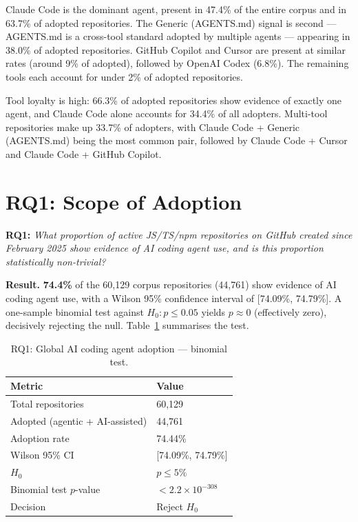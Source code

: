 Claude Code is the dominant agent, present in 47.4\% of the entire corpus and in 63.7\% of adopted repositories. The Generic (AGENTS.md) signal is second --- AGENTS.md is a cross-tool standard adopted by multiple agents --- appearing in 38.0\% of adopted repositories. GitHub Copilot and Cursor are present at similar rates (around 9\% of adopted), followed by OpenAI Codex (6.8\%). The remaining tools each account for under 2\% of adopted repositories.

Tool loyalty is high: 66.3\% of adopted repositories show evidence of exactly one agent, and Claude Code alone accounts for 34.4\% of all adopters. Multi-tool repositories make up 33.7\% of adopters, with Claude Code + Generic (AGENTS.md) being the most common pair, followed by Claude Code + Cursor and Claude Code + GitHub Copilot.

\section{RQ1: Scope of Adoption}
\label{sec:res:rq1}

\textbf{RQ1:} \textit{What proportion of active JS/TS/npm repositories on GitHub created since February 2025 show evidence of AI coding agent use, and is this proportion statistically non-trivial?}

\textbf{Result.} \textbf{74.4\%} of the 60,129 corpus repositories (44,761) show evidence of AI coding agent use, with a Wilson 95\% confidence interval of [74.09\%, 74.79\%]. A one-sample binomial test against $H_0: p \leq 0.05$ yields $p \approx 0$ (effectively zero), decisively rejecting the null. Table~\ref{tab:rq1} summarises the test.

\begin{table}[h]
\centering
\caption{RQ1: Global AI coding agent adoption --- binomial test.}
\label{tab:rq1}
\begin{tabular}{@{}ll@{}}
\toprule
Metric & Value \\
\midrule
Total repositories              & 60,129 \\
Adopted (agentic + AI-assisted) & 44,761 \\
Adoption rate                   & 74.44\% \\
Wilson 95\% CI                  & [74.09\%, 74.79\%] \\
$H_0$                           & $p \leq 5\%$ \\
Binomial test $p$-value         & $<2.2 \times 10^{-308}$ \\
Decision                        & Reject $H_0$ \\
\bottomrule
\end{tabular}
\end{table}

